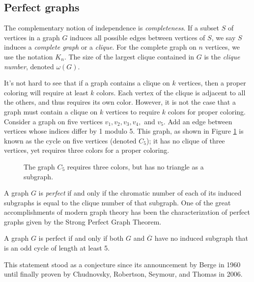 \subsection{Perfect graphs}

The complementary notion of independence is {\it completeness}.  If a subset $S$ of vertices in a graph $G$ induces all possible edges between vertices of $S$, we say $S$ induces a {\it complete graph} or a {\it clique}.  For the complete graph on $n$ vertices, we use the notation $K_n$.  The size of the largest clique contained in $G$ is the {\it clique number}, denoted $\omega(G)$.

It's not hard to see that if a graph contains a clique on $k$ vertices, then a proper coloring will require at least $k$ colors.  Each vertex of the clique is adjacent to all the others, and thus requires its own color.   However, it is not the case that a graph must contain a clique on $k$ vertices to require $k$ colors for proper coloring.  Consider a graph on five vertices $v_1, v_2, v_3, v_4,$ and $v_5$.  Add an edge between vertices whose indices differ by 1 modulo 5.  This graph, as shown in Figure \ref{c5} is known as the cycle on five vertices (denoted $C_5$); it has no clique of three vertices, yet requires three colors for a proper coloring.  
	\begin{figure}
	\begin{center}
		
		\label{c5}
		\caption{The graph $C_5$ requires three colors, but has no triangle as a subgraph.}
	\end{center}
	\end{figure}

A graph $G$ is {\it perfect} if and only if the chromatic number of each of its induced subgraphs is equal to the clique number of that subgraph.  One of the great accomplishments of modern graph theory has been the characterization of perfect graphs given by the  Strong Perfect Graph Theorem.  
\begin{theorem}
A graph $G$ is perfect if and only if both $G$ and $\overline{G}$ have no induced subgraph that is an odd cycle of length at least 5.
\end{theorem}
This statement stood as a conjecture since its announcement by Berge in 1960 until finally proven by Chudnovsky, Robertson, Seymour, and Thomas \cite{spgt} in 2006.

